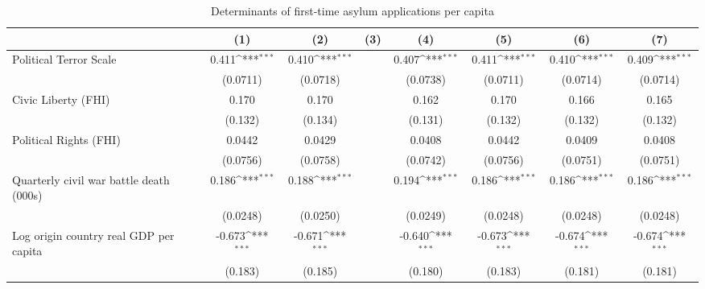 \begin{table}[htbp]\centering
\def\sym#1{\ifmmode^{#1}\else\(^{#1}\)\fi}
\caption{Determinants of first-time asylum applications per capita}
\begin{tabular}{l*{7}{c}}
\hline\hline
                    &\multicolumn{1}{c}{(1)}         &\multicolumn{1}{c}{(2)}         &\multicolumn{1}{c}{(3)}         &\multicolumn{1}{c}{(4)}         &\multicolumn{1}{c}{(5)}         &\multicolumn{1}{c}{(6)}         &\multicolumn{1}{c}{(7)}         \\
\hline
Political Terror Scale&       0.411\sym{***}&       0.410\sym{***}&                     &       0.407\sym{***}&       0.411\sym{***}&       0.410\sym{***}&       0.409\sym{***}\\
                    &    (0.0711)         &    (0.0718)         &                     &    (0.0738)         &    (0.0711)         &    (0.0714)         &    (0.0714)         \\
[1em]
Civic Liberty (FHI) &       0.170         &       0.170         &                     &       0.162         &       0.170         &       0.166         &       0.165         \\
                    &     (0.132)         &     (0.134)         &                     &     (0.131)         &     (0.132)         &     (0.132)         &     (0.132)         \\
[1em]
Political Rights (FHI)&      0.0442         &      0.0429         &                     &      0.0408         &      0.0442         &      0.0409         &      0.0408         \\
                    &    (0.0756)         &    (0.0758)         &                     &    (0.0742)         &    (0.0756)         &    (0.0751)         &    (0.0751)         \\
[1em]
Quarterly civil war battle death (000s)&       0.186\sym{***}&       0.188\sym{***}&                     &       0.194\sym{***}&       0.186\sym{***}&       0.186\sym{***}&       0.186\sym{***}\\
                    &    (0.0248)         &    (0.0250)         &                     &    (0.0249)         &    (0.0248)         &    (0.0248)         &    (0.0248)         \\
[1em]
Log origin country real GDP per capita&      -0.673\sym{***}&      -0.671\sym{***}&                     &      -0.640\sym{***}&      -0.673\sym{***}&      -0.674\sym{***}&      -0.674\sym{***}\\
                    &     (0.183)         &     (0.185)         &                     &     (0.180)         &     (0.183)         &     (0.181)         &     (0.181)         \\

\end{tabular}
\end{table}
